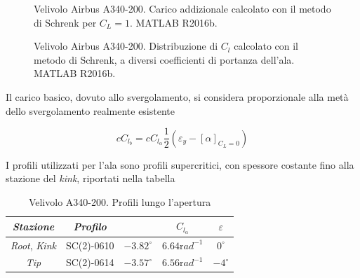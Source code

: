 \begin{figure}[H]
	\centering
	\caption{\footnotesize Velivolo Airbus A340-200. Carico addizionale calcolato con il metodo di Schrenk per $C_L=1$. MATLAB R2016b. }
	\label{fig:V5}
\end{figure}


\begin{figure}[H]
	\centering
	\caption{\footnotesize Velivolo Airbus A340-200. Distribuzione di $C_l$ calcolato con il metodo di Schrenk, a diversi coefficienti di portanza dell'ala. MATLAB R2016b. }
	\label{fig:V6}
\end{figure}

Il carico basico, dovuto allo svergolamento, si considera proporzionale alla metà dello svergolamento realmente esistente

\begin{equation}
\label{eqn:bas}
cC_{l_b}=cC_{l_{\alpha}} \frac{1}{2}(\varepsilon_y-[\alpha]_{C_L=0})
\end{equation}

I profili utilizzati per l’ala sono profili supercritici, con spessore costante fino alla stazione del {\itshape kink}, riportati nella tabella 

\begin{table} [!h]\centering {}
	\begin{tabular}{c  c  c c c }
		\toprule
		\emph{Stazione}& \emph{Profilo}&\alphazl & $C_{l_{\alpha}}$& $\varepsilon$ \\ 
		\midrule
		{\itshape Root}, {\itshape Kink}	&	SC(2)-0610	&	$-3.82 ^{\circ}$	& $6.64 {\mathrm rad}^{-1}$	&$0^{\circ}$	\\
		{\itshape Tip} &  SC(2)-0614 &	$-3.57 ^{\circ}$	& $6.56 {\mathrm rad}^{-1}$	&	$-4^{\circ}$	\\
		\bottomrule
	\end{tabular}
	\caption {\footnotesize Velivolo A340-200. Profili lungo l'apertura}
	\label{tabV3}
\end{table}


